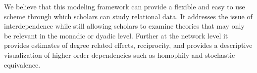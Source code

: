 We believe that this modeling framework can provide a flexible and easy to use scheme through which scholars can study relational data. It addresses the issue of interdependence while still allowing scholars to examine theories that may only be relevant in the monadic or dyadic level. Further at the network level it provides estimates of degree related effects, reciprocity, and provides a descriptive visualization of higher order dependencies such as homophily and stochastic equivalence. 




